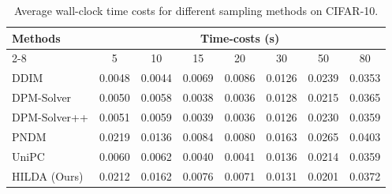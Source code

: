 

\begin{table}[htbp]
    \centering
    \caption{Average wall-clock time costs for different sampling methods on CIFAR-10.}
    \label{tab:cifar10_timing}
    \begin{tabular}{l|ccccccc}
    \toprule
    \multirow{2}{*}{Methods} & \multicolumn{7}{c}{Time-costs (s)} \\
    \cmidrule{2-8}
    & 5 & 10 & 15 & 20 & 30 & 50 & 80 \\
    \midrule
    DDIM & 0.0048 & 0.0044 & 0.0069 & 0.0086 & 0.0126 & 0.0239 & 0.0353 \\
    DPM-Solver & 0.0050 & 0.0058 & 0.0038 & 0.0036 & 0.0128 & 0.0215 & 0.0365 \\
    DPM-Solver++ & 0.0051 & 0.0059 & 0.0039 & 0.0036 & 0.0126 & 0.0230 & 0.0359 \\
    PNDM & 0.0219 & 0.0136 & 0.0084 & 0.0080 & 0.0163 & 0.0265 & 0.0403 \\
    UniPC & 0.0060 & 0.0062 & 0.0040 & 0.0041 & 0.0136 & 0.0214 & 0.0359 \\
    HILDA (Ours) & 0.0212 & 0.0162 & 0.0076 & 0.0071 & 0.0131 & 0.0201 & 0.0372 \\
    \bottomrule
    \end{tabular}
    \end{table}



